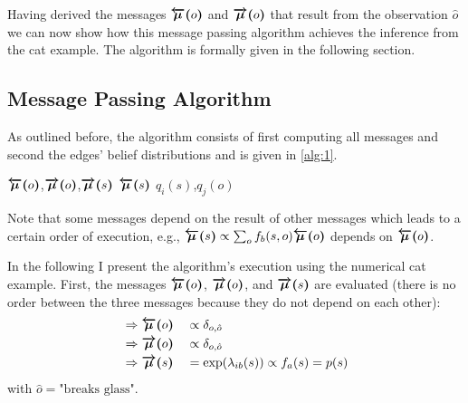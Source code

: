Having derived the messages \(\textcolor{black}{\bm{\overleftarrow{\mu}(}o\bm{)}}\) and \(\textcolor{black}{\bm{\overrightarrow{\mu}(}o\bm{)}}\) that result from the observation \(\hat o\) we can now show how this message passing algorithm achieves the inference from the cat example. The algorithm is formally given in the following section.

\subsection{Message Passing Algorithm}

As outlined before, the algorithm consists of first computing all messages and second the edges' belief distributions and is given in \cref{alg:1}.
\begin{algorithm}[htbp]
    \caption{Message Passing Algorithm of the Simple Agent}
    \label{alg:1}
    \begin{algorithmic}[1]
        \State $\textcolor{black}{\bm{\overleftarrow{\mu}(}o\bm{)}}$,\quad$\textcolor{black}{\bm{\overrightarrow{\mu}(}o\bm{)}}$,\quad$\textcolor{black}{\bm{\overrightarrow{\mu}(}s\bm{)}}$
        \State $\textcolor{black}{\bm{\overleftarrow{\mu}(}s\bm{)}}$
        \State $q_i(s)$,\quad$q_j(o)$
    \end{algorithmic}
\end{algorithm}
Note that some messages depend on the result of other messages which leads to a certain order of execution, e.g., \(\textcolor{black}{\bm{\overleftarrow{\mu}(}s\bm{)}} \propto \sum_o f_b(s,o) \textcolor{black}{\bm{\overleftarrow{\mu}(}o\bm{)}}\) depends on \(\textcolor{black}{\bm{\overleftarrow{\mu}(}o\bm{)}}\).

In the following I present the algorithm's execution using the numerical cat example.
First, the messages \(\textcolor{black}{\bm{\overleftarrow{\mu}(}o\bm{)}}\), \(\textcolor{black}{\bm{\overrightarrow{\mu}(}o\bm{)}}\), and \(\textcolor{black}{\bm{\overrightarrow{\mu}(}s\bm{)}}\) are evaluated (there is no order between the three messages because they do not depend on each other):
\begin{alignat}{2}
     & \Rightarrow \textcolor{black}{\bm{\overleftarrow{\mu}(}o\bm{)}}  &  & \propto \delta_{o,\hat o}                     \\
     & \Rightarrow \textcolor{black}{\bm{\overrightarrow{\mu}(}o\bm{)}} &  & \propto \delta_{o,\hat o}                     \\
     & \Rightarrow \textcolor{black}{\bm{\overrightarrow{\mu}(}s\bm{)}} &  & = \exp(\lambda_{ib}(s)) \propto f_a(s) = p(s)
\end{alignat}
with \(\hat o = \text{"breaks glass"}\).


